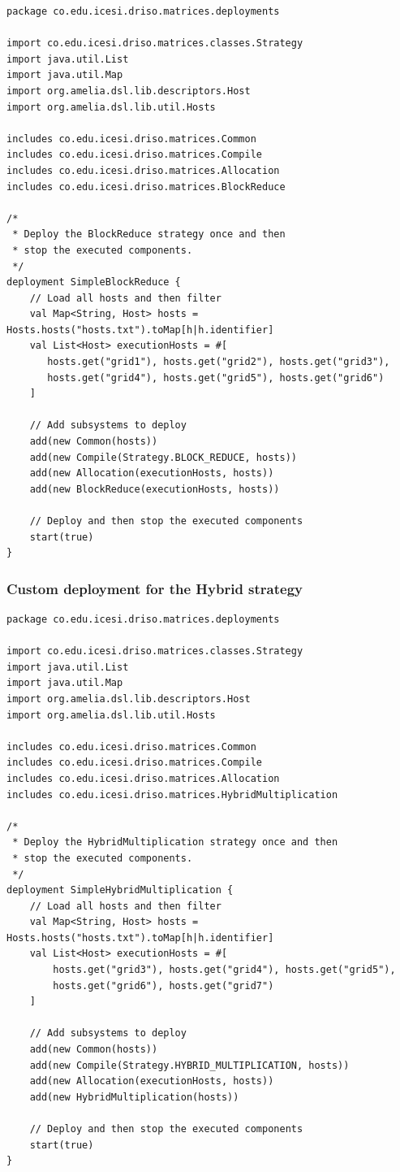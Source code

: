 \documentclass{article}
\begin{document}
\begin{lstlisting}[style=amelia,caption=Custom deployment for BlockReduce strategy.]
package co.edu.icesi.driso.matrices.deployments

import co.edu.icesi.driso.matrices.classes.Strategy
import java.util.List
import java.util.Map
import org.amelia.dsl.lib.descriptors.Host
import org.amelia.dsl.lib.util.Hosts

includes co.edu.icesi.driso.matrices.Common
includes co.edu.icesi.driso.matrices.Compile
includes co.edu.icesi.driso.matrices.Allocation
includes co.edu.icesi.driso.matrices.BlockReduce

/*
 * Deploy the BlockReduce strategy once and then
 * stop the executed components.
 */
deployment SimpleBlockReduce {
	// Load all hosts and then filter
	val Map<String, Host> hosts = Hosts.hosts("hosts.txt").toMap[h|h.identifier]
	val List<Host> executionHosts = #[
	   hosts.get("grid1"), hosts.get("grid2"), hosts.get("grid3"),
	   hosts.get("grid4"), hosts.get("grid5"), hosts.get("grid6")
	]

	// Add subsystems to deploy
	add(new Common(hosts))
	add(new Compile(Strategy.BLOCK_REDUCE, hosts))
	add(new Allocation(executionHosts, hosts))
	add(new BlockReduce(executionHosts, hosts))

	// Deploy and then stop the executed components
	start(true)
}
\end{lstlisting}

\subsubsection{Custom deployment for the Hybrid strategy}

\begin{lstlisting}[style=amelia,caption=Custom deployment for Hybrid strategy.]
package co.edu.icesi.driso.matrices.deployments

import co.edu.icesi.driso.matrices.classes.Strategy
import java.util.List
import java.util.Map
import org.amelia.dsl.lib.descriptors.Host
import org.amelia.dsl.lib.util.Hosts

includes co.edu.icesi.driso.matrices.Common
includes co.edu.icesi.driso.matrices.Compile
includes co.edu.icesi.driso.matrices.Allocation
includes co.edu.icesi.driso.matrices.HybridMultiplication

/*
 * Deploy the HybridMultiplication strategy once and then
 * stop the executed components.
 */
deployment SimpleHybridMultiplication {	 
    // Load all hosts and then filter
    val Map<String, Host> hosts = Hosts.hosts("hosts.txt").toMap[h|h.identifier]
    val List<Host> executionHosts = #[
        hosts.get("grid3"), hosts.get("grid4"), hosts.get("grid5"),
        hosts.get("grid6"), hosts.get("grid7")
    ]

    // Add subsystems to deploy
    add(new Common(hosts))
    add(new Compile(Strategy.HYBRID_MULTIPLICATION, hosts))
    add(new Allocation(executionHosts, hosts))
    add(new HybridMultiplication(hosts))

    // Deploy and then stop the executed components
    start(true)
}
\end{lstlisting}
\end{document}
